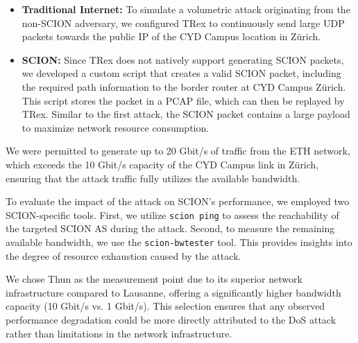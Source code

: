 \begin{itemize}
    \item \textbf{Traditional Internet:}
    To simulate a volumetric attack originating from the non-SCION adversary, we configured TRex to continuously send large UDP packets towards the public IP of the CYD Campus location in Zürich.
    \item \textbf{SCION:} Since TRex does not natively support generating SCION packets, we developed a custom script that creates a valid SCION packet, including the required path information to the border router at CYD Campus Zürich.
    This script stores the packet in a PCAP file, which can then be replayed by TRex.
    Similar to the first attack, the SCION packet contains a large payload to maximize network resource consumption.
\end{itemize}

We were permitted to generate up to 20 Gbit/s of traffic from the ETH network, which exceeds the 10 Gbit/s capacity of the CYD Campus link in Zürich, ensuring that the attack traffic fully utilizes the available bandwidth.

To evaluate the impact of the attack on SCION's performance, we employed two SCION-specific tools.
First, we utilize \texttt{scion ping} to assess the reachability of the targeted SCION AS during the attack.
Second, to measure the remaining available bandwidth, we use the \texttt{scion-bwtester} tool.
This provides insights into the degree of resource exhaustion caused by the attack.

We chose Thun as the measurement point due to its superior network infrastructure compared to Lausanne, offering a significantly higher bandwidth capacity (10 Gbit/s vs. 1 Gbit/s).
This selection ensures that any observed performance degradation could be more directly attributed to the DoS attack rather than limitations in the network infrastructure.